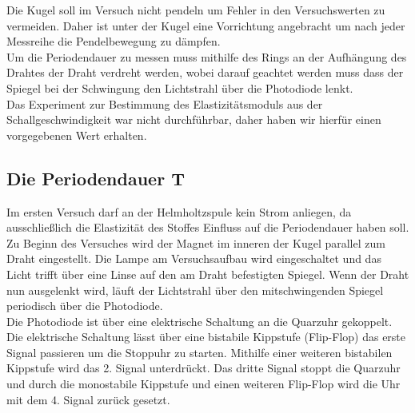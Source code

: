 Die Kugel soll im Versuch nicht pendeln um Fehler in den Versuchswerten zu vermeiden.
Daher ist unter der Kugel eine Vorrichtung angebracht um nach jeder Messreihe die Pendelbewegung zu dämpfen.\\

Um die Periodendauer zu messen muss mithilfe des Rings an der Aufhängung des Drahtes der Draht verdreht werden,
wobei darauf geachtet werden muss dass der Spiegel bei der Schwingung den Lichtstrahl über die Photodiode lenkt.\\

Das Experiment zur Bestimmung des Elastizitätsmoduls aus der Schallgeschwindigkeit war nicht durchführbar,
daher haben wir hierfür einen vorgegebenen Wert erhalten.\\

\subsection{Die Periodendauer T}
Im ersten Versuch darf an der Helmholtzspule kein Strom anliegen, da ausschließlich die Elastizität des Stoffes
 Einfluss auf die Periodendauer haben soll.
Zu Beginn des Versuches wird der Magnet im inneren der Kugel parallel zum Draht eingestellt.
Die Lampe am Versuchsaufbau wird eingeschaltet und das Licht trifft über eine Linse auf den am Draht befestigten Spiegel.
Wenn der Draht nun ausgelenkt wird, läuft der Lichtstrahl über den mitschwingenden Spiegel periodisch über die Photodiode.\\
Die Photodiode ist über eine elektrische Schaltung an die Quarzuhr gekoppelt.
Die elektrische Schaltung lässt über eine bistabile Kippstufe (Flip-Flop) das erste Signal passieren um die Stoppuhr zu starten.
Mithilfe einer weiteren bistabilen Kippstufe wird das 2. Signal unterdrückt.
Das dritte Signal stoppt die Quarzuhr und durch die monostabile Kippstufe und einen weiteren Flip-Flop wird die Uhr mit dem 4. Signal zurück gesetzt.\\
